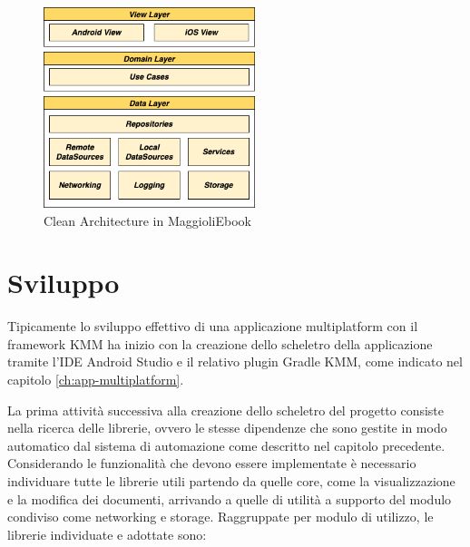 \begin{figure}[H]
    \centering
    \includegraphics[width=0.55\textwidth]{img/clean-architecture.png}
    \caption{Clean Architecture in MaggioliEbook}
    \label{clean-arch-kmm-fig}
\end{figure}

\section{Sviluppo}
Tipicamente lo sviluppo effettivo di una applicazione multiplatform con il framework KMM ha inizio con la creazione dello scheletro della applicazione tramite l'IDE Android Studio e il relativo plugin Gradle KMM, come indicato nel capitolo \ref{ch:app-multiplatform}.

La prima attività successiva alla creazione dello scheletro del progetto consiste nella ricerca delle librerie, ovvero le stesse dipendenze che sono gestite in modo automatico dal sistema di automazione come descritto nel capitolo precedente. Considerando le funzionalità che devono essere implementate è necessario individuare tutte le librerie utili partendo da quelle core, come la visualizzazione e la modifica dei documenti, arrivando a quelle di utilità a supporto del modulo condiviso come networking e storage. Raggruppate per modulo di utilizzo, le librerie individuate e adottate sono:

